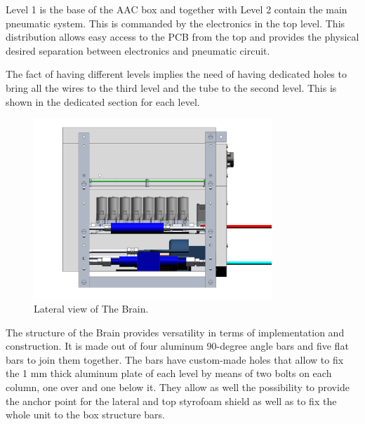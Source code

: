 Level 1 is the base of the AAC box and together with Level 2 contain the main pneumatic system. This is commanded by the electronics in the top level. This distribution allows easy access to the PCB from the top and provides the physical desired separation between electronics and pneumatic circuit. 

The fact of having different levels implies the need of having dedicated holes to bring all the wires to the third level and the tube to the second level. This is shown in the dedicated section for each level.

\begin{figure}[H]
    \centering
    \includegraphics[width=0.8\textwidth]{4-experiment-design/img/Mechanical/Brain_Lateral.png}
    \caption{Lateral view of The Brain.}
    \label{brain_lateral}
\end{figure}

\smallskip
The structure of the Brain provides versatility in terms of implementation and construction. It is made out of four aluminum 90-degree angle bars and five flat bars to join them together. The bars have custom-made holes that allow to fix the 1 mm thick aluminum plate of each level by means of two bolts on each column, one over and one below it. They allow as well the possibility to provide the anchor point for the lateral and top styrofoam shield as well as to fix the whole unit to the box structure bars. 

